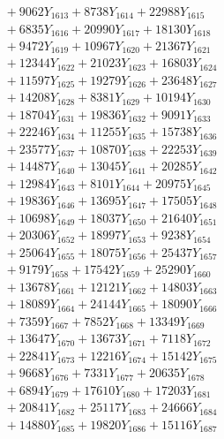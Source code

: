 \documentclass[a4paper,10pt]{article}
\begin{document}
{\begin{align}
&\;  + 9062 Y_{1613} + 8738 Y_{1614} + 22988 Y_{1615} \\[0.3ex]
&\;  + 6835 Y_{1616} + 20990 Y_{1617} + 18130 Y_{1618} \\[0.5ex]\allowbreak
&\;  + 9472 Y_{1619} + 10967 Y_{1620} + 21367 Y_{1621} \\[0.3ex]
&\;  + 12344 Y_{1622} + 21023 Y_{1623} + 16803 Y_{1624} \\[0.3ex]
&\;  + 11597 Y_{1625} + 19279 Y_{1626} + 23648 Y_{1627} \\[0.3ex]
&\;  + 14208 Y_{1628} + 8381 Y_{1629} + 10194 Y_{1630} \\[0.3ex]
&\;  + 18704 Y_{1631} + 19836 Y_{1632} + 9091 Y_{1633} \\[0.3ex]
&\;  + 22246 Y_{1634} + 11255 Y_{1635} + 15738 Y_{1636} \\[0.3ex]
&\;  + 23577 Y_{1637} + 10870 Y_{1638} + 22253 Y_{1639} \\[0.3ex]
&\;  + 14487 Y_{1640} + 13045 Y_{1641} + 20285 Y_{1642} \\[0.3ex]
&\;  + 12984 Y_{1643} + 8101 Y_{1644} + 20975 Y_{1645} \\[0.3ex]
&\;  + 19836 Y_{1646} + 13695 Y_{1647} + 17505 Y_{1648} \\[0.5ex]\allowbreak
&\;  + 10698 Y_{1649} + 18037 Y_{1650} + 21640 Y_{1651} \\[0.3ex]
&\;  + 20306 Y_{1652} + 18997 Y_{1653} + 9238 Y_{1654} \\[0.3ex]
&\;  + 25064 Y_{1655} + 18075 Y_{1656} + 25437 Y_{1657} \\[0.3ex]
&\;  + 9179 Y_{1658} + 17542 Y_{1659} + 25290 Y_{1660} \\[0.3ex]
&\;  + 13678 Y_{1661} + 12121 Y_{1662} + 14803 Y_{1663} \\[0.3ex]
&\;  + 18089 Y_{1664} + 24144 Y_{1665} + 18090 Y_{1666} \\[0.3ex]
&\;  + 7359 Y_{1667} + 7852 Y_{1668} + 13349 Y_{1669} \\[0.3ex]
&\;  + 13647 Y_{1670} + 13673 Y_{1671} + 7118 Y_{1672} \\[0.3ex]
&\;  + 22841 Y_{1673} + 12216 Y_{1674} + 15142 Y_{1675} \\[0.3ex]
&\;  + 9668 Y_{1676} + 7331 Y_{1677} + 20635 Y_{1678} \\[0.5ex]\allowbreak
&\;  + 6894 Y_{1679} + 17610 Y_{1680} + 17203 Y_{1681} \\[0.3ex]
&\;  + 20841 Y_{1682} + 25117 Y_{1683} + 24666 Y_{1684} \\[0.3ex]
&\;  + 14880 Y_{1685} + 19820 Y_{1686} + 15116 Y_{1687} \\[0.3ex]

\end{align}}
\end{document}
